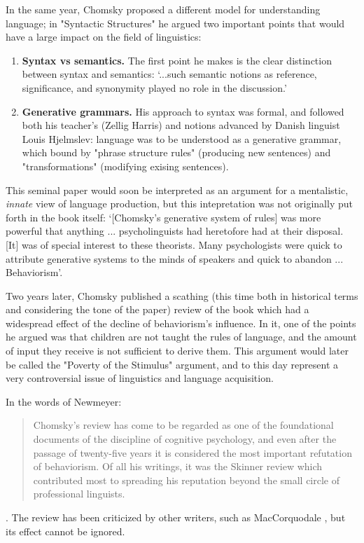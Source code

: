 \documentclass[../main.tex]{subfiles}
\begin{document}
In the same year, Chomsky proposed a different model for understanding language; in "Syntactic Structures" he argued two important points that would have a large impact on the field of linguistics:
\begin{enumerate}
    \item \textbf{Syntax vs semantics.} The first point he makes is the clear distinction between syntax and semantics: \enquote*{...such semantic notions as reference, significance, and synonymity played no role in the discussion.}
    \item \textbf{Generative grammars.} His approach to syntax was formal, and followed both his teacher's (Zellig Harris) and notions advanced by Danish linguist Louis Hjelmslev: language was to be understood as a generative grammar, which bound by "phrase structure rules" (producing new sentences) and "transformations" (modifying exising sentences).
\end{enumerate}
This seminal paper would soon be interpreted as an argument for a mentalistic, \textit{innate} view of language production, but this intepretation was not originally put forth in the book itself: \enquote*{[Chomsky's generative system of rules] was more powerful that anything ... psycholinguists had heretofore had at their disposal. [It] was of special interest to these theorists. Many psychologists were quick to attribute generative systems to the minds of speakers and quick to abandon ... Behaviorism}\cite{steinbergPsycholinguisticsLanguageMind2013}.

Two years later, Chomsky published a scathing (this time both in historical terms and considering the tone of the paper) review \cite{chomskyReviewBFSkinner2013} of the book which had a widespread effect of the decline of behaviorism's influence. In it, one of the points he argued was that children are not taught the rules of language, and the amount of input they receive is not sufficient to derive them. This argument would later be called the "Poverty of the Stimulus" argument, and to this day represent a very controversial issue of linguistics and language acquisition.

In the words of Newmeyer:
\begin{quote}
    Chomsky's review has come to be regarded as one of the foundational documents of the discipline of cognitive psychology, and even after the passage of twenty-five years it is considered the most important refutation of behaviorism. Of all his writings, it was the Skinner review which contributed most to spreading his reputation beyond the small circle of professional linguists.
\end{quote}\cite{newmeyerPoliticsLinguistics1986}. The review has been criticized by other writers, such as MacCorquodale \cite{maccorquodaleChomskyReviewSkinner1970}, but its effect cannot be ignored.
\end{document}
